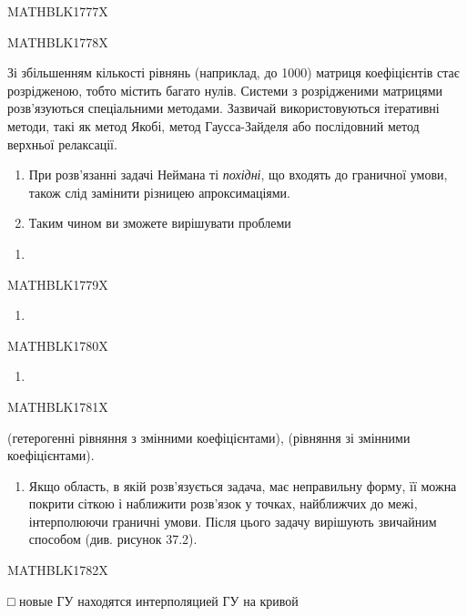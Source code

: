 \documentclass[
  ukrainian,
]{article}
\providecommand{\tightlist}{%
  \setlength{\itemsep}{0pt}\setlength{\parskip}{0pt}}
\begin{document}
MATHBLK1777X

MATHBLK1778X

Зі збільшенням кількості рівнянь (наприклад, до 1000) матриця
коефіцієнтів стає розрідженою, тобто містить багато нулів. Системи з
розрідженими матрицями розв'язуються спеціальними методами. Зазвичай
використовуються ітеративні методи, такі як метод Якобі, метод
Гаусса-Зайделя або послідовний метод верхньої релаксації.

\begin{enumerate}
\def\labelenumi{\arabic{enumi}.}
\setcounter{enumi}{3}
\item
  При розв'язанні задачі Неймана ті \emph{похідні}, що входять до
  граничної умови, також слід замінити різницею апроксимаціями.
\item
  Таким чином ви зможете вирішувати проблеми
\end{enumerate}

\begin{enumerate}
\def\labelenumi{\alph{enumi})}
\tightlist
\item
\end{enumerate}

MATHBLK1779X

\begin{enumerate}
\def\labelenumi{\arabic{enumi})}
\setcounter{enumi}{5}
\tightlist
\item
\end{enumerate}

MATHBLK1780X

\begin{enumerate}
\def\labelenumi{\Alph{enumi})}
\setcounter{enumi}{1}
\tightlist
\item
\end{enumerate}

MATHBLK1781X

(гетерогенні рівняння з змінними коефіцієнтами), (рівняння зі змінними
коефіцієнтами).

\begin{enumerate}
\def\labelenumi{\arabic{enumi}.}
\setcounter{enumi}{5}
\tightlist
\item
  Якщо область, в якій розв'язується задача, має неправильну форму, її
  можна покрити сіткою і наближити розв'язок у точках, найближчих до
  межі, інтерполюючи граничні умови. Після цього задачу вирішують
  звичайним способом (див. рисунок 37.2).
\end{enumerate}

MATHBLK1782X

□ новые ГУ находятся интерполяцией ГУ на кривой
\end{document}
